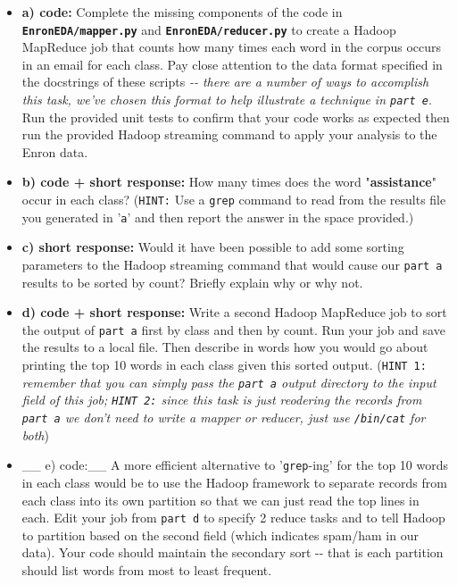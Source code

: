 \documentclass[11pt]{article}
\begin{document}
\begin{itemize}
\item
  \textbf{a) code:} Complete the missing components of the code in
  \textbf{\texttt{EnronEDA/mapper.py}} and
  \textbf{\texttt{EnronEDA/reducer.py}} to create a Hadoop MapReduce job
  that counts how many times each word in the corpus occurs in an email
  for each class. Pay close attention to the data format specified in
  the docstrings of these scripts \emph{-\/- there are a number of ways
  to accomplish this task, we've chosen this format to help illustrate a
  technique in \texttt{part\ e}}. Run the provided unit tests to confirm
  that your code works as expected then run the provided Hadoop
  streaming command to apply your analysis to the Enron data.
\item
  \textbf{b) code + short response:} How many times does the word
  "\textbf{assistance}" occur in each class? (\texttt{HINT:} Use a
  \texttt{grep} command to read from the results file you generated in
  '\texttt{a}' and then report the answer in the space provided.)
\item
  \textbf{c) short response:} Would it have been possible to add some
  sorting parameters to the Hadoop streaming command that would cause
  our \texttt{part\ a} results to be sorted by count? Briefly explain
  why or why not.
\item
  \textbf{d) code + short response:} Write a second Hadoop MapReduce job
  to sort the output of \texttt{part\ a} first by class and then by
  count. Run your job and save the results to a local file. Then
  describe in words how you would go about printing the top 10 words in
  each class given this sorted output. (\texttt{HINT\ 1:} \emph{remember
  that you can simply pass the \texttt{part\ a} output directory to the
  input field of this job; \texttt{HINT\ 2:} since this task is just
  reodering the records from \texttt{part\ a} we don't need to write a
  mapper or reducer, just use \texttt{/bin/cat} for both})
\item
  \_\_ e) code:\_\_ A more efficient alternative to '\texttt{grep}-ing'
  for the top 10 words in each class would be to use the Hadoop
  framework to separate records from each class into its own partition
  so that we can just read the top lines in each. Edit your job from
  \texttt{part\ d} to specify 2 reduce tasks and to tell Hadoop to
  partition based on the second field (which indicates spam/ham in our
  data). Your code should maintain the secondary sort -\/- that is each
  partition should list words from most to least frequent.
\end{itemize}
\end{document}
